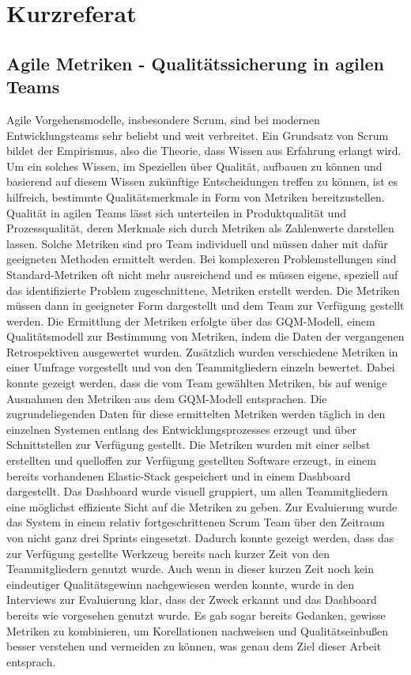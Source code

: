 \newpage
\chapter*{Kurzreferat}
\section*{Agile Metriken {-} Qualitätssicherung in agilen Teams}

Agile Vorgehensmodelle, insbesondere Scrum, sind bei modernen Entwicklungsteams sehr beliebt und weit verbreitet.
Ein Grundsatz von Scrum bildet der Empirismus, also die Theorie, dass Wissen aus Erfahrung erlangt wird.
Um ein solches Wissen, im Speziellen über Qualität, aufbauen zu können und basierend auf diesem Wissen zukünftige Entscheidungen treffen zu können, ist es hilfreich, bestimmte Qualitätsmerkmale in Form von Metriken bereitzustellen.
Qualität in agilen Teams lässt sich unterteilen in Produktqualität und Prozessqualität, deren Merkmale sich durch Metriken als Zahlenwerte darstellen lassen.
Solche Metriken sind pro Team individuell und müssen daher mit dafür geeigneten Methoden ermittelt werden.
Bei komplexeren Problemstellungen sind Standard-Metriken oft nicht mehr ausreichend und es müssen eigene, speziell auf das identifizierte Problem zugeschnittene, Metriken erstellt werden.
Die Metriken müssen dann in geeigneter Form dargestellt und dem Team zur Verfügung gestellt werden.
Die Ermittlung der Metriken erfolgte über das \ac{GQM}-Modell, einem Qualitätsmodell zur Bestimmung von Metriken, indem die Daten der vergangenen Retrospektiven ausgewertet wurden.
Zusätzlich wurden verschiedene Metriken in einer Umfrage vorgestellt und von den Teammitgliedern einzeln bewertet.
Dabei konnte gezeigt werden, dass die vom Team gewählten Metriken, bis auf wenige Ausnahmen den Metriken aus dem \ac{GQM}-Modell entsprachen.
Die zugrundeliegenden Daten für diese ermittelten Metriken werden täglich in den einzelnen Systemen entlang des Entwicklungsprozesses erzeugt und über Schnittstellen zur Verfügung gestellt.
Die Metriken wurden mit einer selbst erstellten und quelloffen zur Verfügung gestellten Software erzeugt, in einem bereits vorhandenen Elastic-Stack gespeichert und in einem Dashboard dargestellt.
Das Dashboard wurde visuell gruppiert, um allen Teammitgliedern eine möglichst effiziente Sicht auf die Metriken zu geben.
Zur Evaluierung wurde das System in einem relativ fortgeschrittenen Scrum Team über den Zeitraum von nicht ganz drei Sprints eingesetzt.
Dadurch konnte gezeigt werden, dass das zur Verfügung gestellte Werkzeug bereits nach kurzer Zeit von den Teammitgliedern genutzt wurde.
Auch wenn in dieser kurzen Zeit noch kein eindeutiger Qualitätsgewinn nachgewiesen werden konnte, wurde in den Interviews zur Evaluierung klar, dass der Zweck erkannt und das Dashboard bereits wie vorgesehen genutzt wurde.
Es gab sogar bereits Gedanken, gewisse Metriken zu kombinieren, um Korellationen nachweisen und Qualitätseinbußen besser verstehen und vermeiden zu können, was genau dem Ziel dieser Arbeit entsprach.

